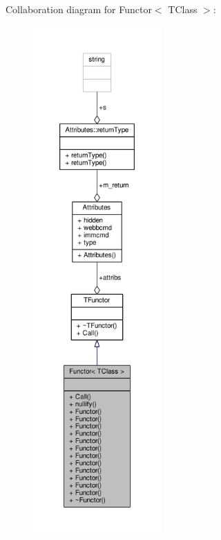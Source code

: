 Collaboration diagram for Functor$<$ T\+Class $>$\+:
\nopagebreak
\begin{figure}[H]
\begin{center}
\leavevmode
\includegraphics[height=550pt]{dd/de8/classFunctor__coll__graph}
\end{center}
\end{figure}
